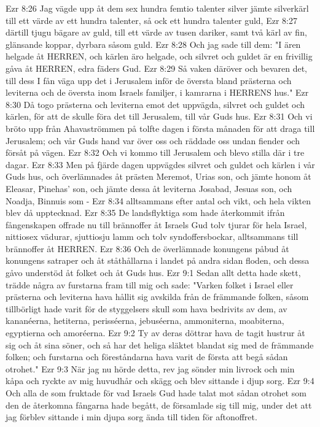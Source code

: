 Ezr 8:26  Jag vägde upp åt dem sex hundra femtio talenter silver jämte silverkärl till ett värde av ett hundra talenter, så ock ett hundra talenter guld,
Ezr 8:27  därtill tjugu bägare av guld, till ett värde av tusen dariker, samt två kärl av fin, glänsande koppar, dyrbara såsom guld.
Ezr 8:28  Och jag sade till dem: "I ären helgade åt HERREN, och kärlen äro helgade, och silvret och guldet är en frivillig gåva åt HERREN, edra fäders Gud.
Ezr 8:29  Så vaken däröver och bevaren det, till dess I fån väga upp det i Jerusalem inför de översta bland prästerna och leviterna och de översta inom Israels familjer, i kamrarna i HERRENS hus."
Ezr 8:30  Då togo prästerna och leviterna emot det uppvägda, silvret och guldet och kärlen, för att de skulle föra det till Jerusalem, till vår Guds hus.
Ezr 8:31  Och vi bröto upp från Ahavaströmmen på tolfte dagen i första månaden för att draga till Jerusalem; och vår Guds hand var över oss och räddade oss undan fiender och försåt på vägen.
Ezr 8:32  Och vi kommo till Jerusalem och blevo stilla där i tre dagar.
Ezr 8:33  Men på fjärde dagen uppvägdes silvret och guldet och kärlen i vår Guds hus, och överlämnades åt prästen Meremot, Urias son, och jämte honom åt Eleasar, Pinehas' son, och jämte dessa åt leviterna Josabad, Jesuas son, och Noadja, Binnuis som -
Ezr 8:34  alltsammans efter antal och vikt, och hela vikten blev då upptecknad.
Ezr 8:35  De landsflyktiga som hade återkommit ifrån fångenskapen offrade nu till brännoffer åt Israels Gud tolv tjurar för hela Israel, nittiosex vädurar, sjuttiosju lamm och tolv syndoffersbockar, alltsammans till brännoffer åt HERREN.
Ezr 8:36  Och de överlämnade konungens påbud åt konungens satraper och åt ståthållarna i landet på andra sidan floden, och dessa gåvo understöd åt folket och åt Guds hus.
Ezr 9:1  Sedan allt detta hade skett, trädde några av furstarna fram till mig och sade: "Varken folket i Israel eller prästerna och leviterna hava hållit sig avskilda från de främmande folken, såsom tillbörligt hade varit för de styggelsers skull som hava bedrivits av dem, av kananéerna, hetiterna, perisséerna, jebuséerna, ammoniterna, moabiterna, egyptierna och amoréerna.
Ezr 9:2  Ty av deras döttrar hava de tagit hustrur åt sig och åt sina söner, och så har det heliga släktet blandat sig med de främmande folken; och furstarna och föreståndarna hava varit de första att begå sådan otrohet."
Ezr 9:3  När jag nu hörde detta, rev jag sönder min livrock och min kåpa och ryckte av mig huvudhår och skägg och blev sittande i djup sorg.
Ezr 9:4  Och alla de som fruktade för vad Israels Gud hade talat mot sådan otrohet som den de återkomna fångarna hade begått, de församlade sig till mig, under det att jag förblev sittande i min djupa sorg ända till tiden för aftonoffret.

